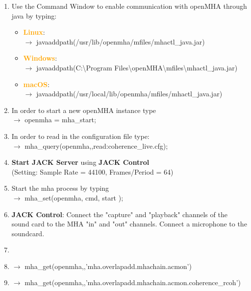 \documentclass[11pt,a4paper,twoside]{article}
\newcommand{\+}{\discretionary{\mbox{\scriptsize$\hookleftarrow$}}{}{}}
\begin{document}
\begin{enumerate}
\item Use the Command Window to enable communication with openMHA through java by typing: 

\begin{itemize}
\item \textcolor{orange}{\textbf{Linux}}: \\ $\rightarrow$
  {\ttfamily javaaddpath(\textquotesingle{}/usr/lib/openmha/mfiles/mhactl\_java.jar\textquotesingle{})}
\item \textcolor{orange}{\textbf{Windows}}: \\ $\rightarrow$
  {\ttfamily javaaddpath(\textquotesingle{}C:\textbackslash Program Files\textbackslash openMHA\textbackslash mfiles\textbackslash mhactl\_java.jar\textquotesingle{})}
\item \textcolor{orange}{\textbf{macOS}}: \\ $\rightarrow$
  {\ttfamily javaaddpath(\textquotesingle{}/usr/local/lib/openmha/mfiles/mhactl\_java.jar\textquotesingle{})}
\end{itemize}

\item In order to start a new openMHA instance type \\
  $\rightarrow$ {\ttfamily openmha = mha\_start;}
\item In order to read in the configuration file type: \\
  $\rightarrow$ {\ttfamily mha\_query(openmha,\textquotesingle{}\textquotesingle{},\textquotesingle{}read:coherence\_live.cfg\textquotesingle{});}
\item \textbf{Start JACK Server} using \textbf{JACK Control}\\
  (Setting: Sample Rate = 44100, Frames/Period = 64)
\item Start the mha process by typing \\ $\rightarrow$
  {\ttfamily mha\_set(openmha, \textquotesingle{}cmd\textquotesingle{},
                      \textquotesingle{}start\textquotesingle{} );}
\item \textbf{JACK Control}: Connect the "capture" and "playback" channels
  of the sound card to the MHA "in" and "out" channels.
  Connect a microphone to the soundcard.
\item 
\item $\rightarrow$ {\ttfamily mha\_get(openmha,\textquotesingle{}\textquotesingle{},\textquotesingle{}'mha.overlapadd.mhachain.acmon')}
\item $\rightarrow$ {\ttfamily mha\_get(openmha,\textquotesingle{}\textquotesingle{},\textquotesingle{}'mha.overlapadd.mhachain.acmon.coherence\_rcoh')}


\end{enumerate}
\end{document}
